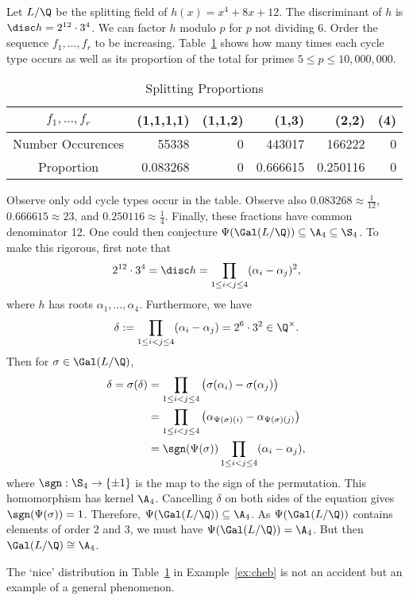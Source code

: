 \begin{ex}\label{ex:cheb}
Let $L/\Q$ be the splitting field of $h(x)= x^4+8x+12$. The discriminant of $h$ is $\disc h= 2^{12} \cdot 3^4$. We can factor $h$ modulo $p$ for $p$ not dividing 6. Order the sequence $f_1,\ldots,f_r$ to be increasing. Table~\ref{tab:factor} shows how many times each cycle type occurs as well as its proportion of the total for primes $5 \leq p \leq 10,000,000$. 
	\begin{table}
	\centering
	\caption{Splitting Proportions \label{tab:factor}}
	\begin{tabular}{c|rrrrr}
	$f_1,\ldots,f_r$ & (1,1,1,1) & (1,1,2) & (1,3) & (2,2) & (4) \\ \hline 
	Number Occurences & 55338 & 0 & 443017 & 166222 & 0 \\
	Proportion & 0.083268 & 0 & 0.666615 & 0.250116 & 0 
	\end{tabular}
	\end{table}
Observe only odd cycle types occur in the table. Observe also $0.083268 \approx \frac{1}{12}$, $0.666615 \approx{2}{3}$, and $0.250116 \approx \frac{1}{4}$. Finally, these fractions have common denominator 12. One could then conjecture $\Psi(\Gal(L/\Q)) \subseteq \A_4 \subseteq \S_4$. To make this rigorous, first note that
	\[
	2^{12} \cdot 3^4 = \disc h = \prod_{1 \leq i < j \leq 4} (\alpha_i - \alpha_j)^2,
	\]
where $h$ has roots $\alpha_1,\ldots,\alpha_4$. Furthermore, we have
	\[
	\delta:= \prod_{1 \leq i<j \leq 4} (\alpha_i - \alpha_j) = 2^6 \cdot 3^2 \in \Q^\times.
	\]
Then for $\sigma \in \Gal(L/\Q)$,
	\[
	\begin{split}
	\delta= \sigma(\delta)&= \prod_{1 \leq i<j \leq 4} \big( \sigma(\alpha_i) - \sigma(\alpha_j) \big) \\
	&= \prod_{1 \leq i<j \leq 4} \big( \alpha_{\Psi(\sigma)(i)} - \alpha_{\Psi(\sigma)(j)} \big) \\
	&= \sgn(\Psi(\sigma)) \prod_{1 \leq i<j \leq 4} (\alpha_i - \alpha_j),
	\end{split}
	\]
where $\sgn: \S_4 \to \{\pm 1\}$ is the map to the sign of the permutation. This homomorphism has kernel $\A_4$. Cancelling $\delta$ on both sides of the equation gives $\sgn(\Psi(\sigma))=1$. Therefore, $\Psi(\Gal(L/\Q)) \subseteq \A_4$. As $\Psi(\Gal(L/\Q))$ contains elements of order 2 and 3, we must have $\Psi(\Gal(L/\Q))=\A_4$. But then $\Gal(L/\Q) \cong \A_4$. \xqed 
\end{ex}

The `nice' distribution in Table~\ref{tab:factor} in Example~\ref{ex:cheb} is not an accident but an example of a general phenomenon. 


